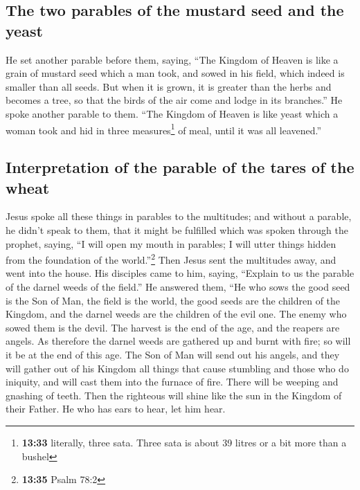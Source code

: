 \hypertarget{the-two-parables-of-the-mustard-seed-and-the-yeast}{%
\subsection{The two parables of the mustard seed and the
yeast}\label{the-two-parables-of-the-mustard-seed-and-the-yeast}}

 He set another parable before them, saying, ``The
Kingdom of Heaven is like a grain of mustard seed which a man took, and
sowed in his field,  which indeed is smaller than all
seeds. But when it is grown, it is greater than the herbs and becomes a
tree, so that the birds of the air come and lodge in its branches.''
 He spoke another parable to them. ``The Kingdom of
Heaven is like yeast which a woman took and hid in three
measures\footnote{\textbf{13:33} literally, three sata. Three sata is
  about 39 litres or a bit more than a bushel} of meal, until it was all
leavened.''

\hypertarget{interpretation-of-the-parable-of-the-tares-of-the-wheat}{%
\subsection{Interpretation of the parable of the tares of the
wheat}\label{interpretation-of-the-parable-of-the-tares-of-the-wheat}}

 Jesus spoke all these things in parables to the
multitudes; and without a parable, he didn't speak to them,
 that it might be fulfilled which was spoken through the
prophet, saying, ``I will open my mouth in parables; I will utter things
hidden from the foundation of the world.''\footnote{\textbf{13:35} Psalm
  78:2}  Then Jesus sent the multitudes away, and went
into the house. His disciples came to him, saying, ``Explain to us the
parable of the darnel weeds of the field.''  He answered
them, ``He who sows the good seed is the Son of Man,  the
field is the world, the good seeds are the children of the Kingdom, and
the darnel weeds are the children of the evil one.  The
enemy who sowed them is the devil. The harvest is the end of the age,
and the reapers are angels.  As therefore the darnel
weeds are gathered up and burnt with fire; so will it be at the end of
this age.  The Son of Man will send out his angels, and
they will gather out of his Kingdom all things that cause stumbling and
those who do iniquity,  and will cast them into the
furnace of fire. There will be weeping and gnashing of teeth.
 Then the righteous will shine like the sun in the
Kingdom of their Father. He who has ears to hear, let him hear.

